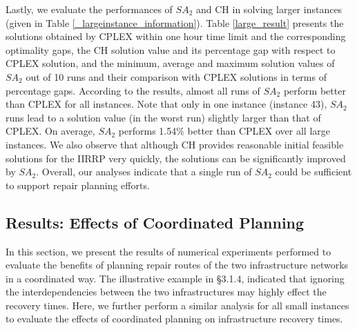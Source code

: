 \documentclass[11pt]{article}
\begin{document}
Lastly, we evaluate the performances of $SA_2$ and CH in solving larger instances (given in Table \ref{_largeinstance_information}). Table \ref{large_result} presents the solutions obtained by CPLEX within one hour time limit and the corresponding optimality gaps, the CH solution value and its percentage gap with respect to CPLEX solution, and the minimum, average and maximum solution values of $SA_2$ out of 10 runs and their comparison with CPLEX solutions in terms of percentage gaps. According to the results, almost all runs of $SA_2$ perform better than CPLEX for all instances. Note that only in one instance (instance 43), $SA_2$ runs lead to a solution value (in the worst run) slightly larger than that of CPLEX. On average, $SA_2$ performs 1.54\% better than CPLEX over all large instances. We also observe that although CH provides reasonable initial feasible solutions for the IIRRP very quickly, the solutions can be significantly improved by $SA_2$. Overall, our analyses indicate that a single run of $SA_2$ could be sufficient to support repair planning efforts.

\subsection{Results: Effects of Coordinated Planning}
In this section, we present the results of numerical experiments performed to evaluate the benefits of planning repair routes of the two infrastructure networks in a coordinated way. The illustrative example in \S 3.1.4, indicated that ignoring the interdependencies between the two infrastructures may highly effect the recovery times. Here, we further perform a similar analysis for all small instances to evaluate the effects of coordinated planning on infrastructure recovery times. 
\end{document}
